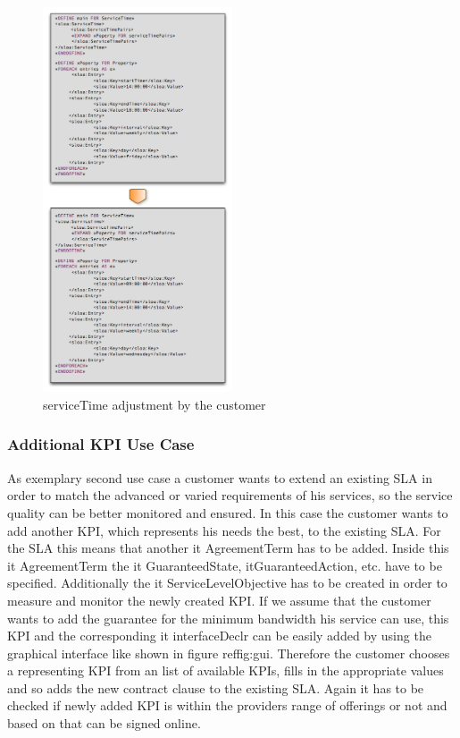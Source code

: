 \begin{figure}[ht]
\includegraphics[width=0.5\textwidth]{fig/ServiceTimeChange.png}
\caption{serviceTime adjustment by the customer}
\label{fig:serviceTime}
\end{figure}



\subsubsection{Additional KPI Use Case}
As exemplary second use case a customer wants to extend an existing SLA in order to match the advanced or varied requirements of his services, so the service quality can be better monitored and ensured. In this case the customer wants to add another KPI, which represents his needs the best, to the existing SLA. For the SLA this means that another {it AgreementTerm} has to be added. Inside this {it AgreementTerm} the {it GuaranteedState}, it{GuaranteedAction}, etc. have to be specified. 
Additionally the {it ServiceLevelObjective} has to be created in order to measure and monitor the newly created KPI. If we assume that the customer wants to add the guarantee for the minimum bandwidth his service can use, this KPI and the corresponding {it interfaceDeclr} can be easily added by using the graphical interface like shown in figure ref{fig:gui}. Therefore the customer chooses a representing KPI from an list of available KPIs, fills in the appropriate values and so adds the new contract clause to the existing SLA. Again it has to be checked if newly added KPI is within the providers range of offerings or not and based on that can be signed online.


